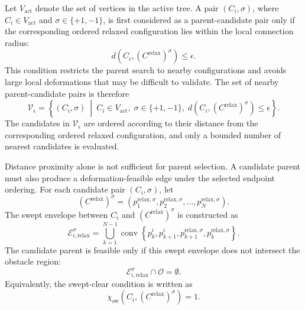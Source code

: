 \documentclass{pas}
\begin{document}
Let \(V_{\mathrm{act}}\) denote the set of vertices in the active tree. A pair
\(\left(C_i,\sigma\right)\), where \(C_i\in V_{\mathrm{act}}\) and
\(\sigma\in\{+1,-1\}\), is first considered as a parent-candidate pair only if
the corresponding ordered relaxed configuration lies within the local connection
radius:
\begin{equation}
d
\left(
C_i,
\left(C^{\mathrm{relax}}\right)^{\sigma}
\right)
\leq
\epsilon .
\label{eq:parent_distance_filter}
\end{equation}
This condition restricts the parent search to nearby configurations and avoids
large local deformations that may be difficult to validate. The set of nearby
parent-candidate pairs is therefore
\begin{equation}
\mathcal{V}_{\epsilon}
=
\left\{
\left(C_i,\sigma\right)
\ \middle|\
C_i\in V_{\mathrm{act}},
\;
\sigma\in\{+1,-1\},
\;
d
\left(
C_i,
\left(C^{\mathrm{relax}}\right)^{\sigma}
\right)
\leq
\epsilon
\right\}.
\label{eq:nearby_parent_set}
\end{equation}
The candidates in \(\mathcal{V}_{\epsilon}\) are ordered according to their
distance from the corresponding ordered relaxed configuration, and only a
bounded number of nearest candidates is evaluated.

Distance proximity alone is not sufficient for parent selection. A candidate
parent must also produce a deformation-feasible edge under the selected endpoint
ordering. For each candidate pair \(\left(C_i,\sigma\right)\), let
\[
\left(C^{\mathrm{relax}}\right)^{\sigma}
=
\left(
p_1^{\mathrm{relax},\sigma},
p_2^{\mathrm{relax},\sigma},
\ldots,
p_N^{\mathrm{relax},\sigma}
\right).
\]
The swept envelope between \(C_i\) and
\(\left(C^{\mathrm{relax}}\right)^{\sigma}\) is constructed as
\begin{equation}
\mathcal{E}_{i,\mathrm{relax}}^{\sigma}
=
\bigcup_{k=1}^{N-1}
\operatorname{conv}
\left\{
p_k^{i},
p_{k+1}^{i},
p_{k+1}^{\mathrm{relax},\sigma},
p_k^{\mathrm{relax},\sigma}
\right\}.
\label{eq:parent_swept_envelope}
\end{equation}
The candidate parent is feasible only if this swept envelope does not intersect
the obstacle region:
\begin{equation}
\mathcal{E}_{i,\mathrm{relax}}^{\sigma}
\cap
\mathcal{O}
=
\emptyset .
\label{eq:parent_swept_envelope_free}
\end{equation}
Equivalently, the swept-clear condition is written as
\begin{equation}
\chi_{\mathrm{sw}}
\left(
C_i,
\left(C^{\mathrm{relax}}\right)^{\sigma}
\right)
=
1 .
\label{eq:parent_swept_clear_check}
\end{equation}
\end{document}
